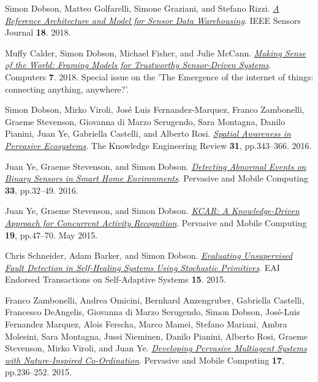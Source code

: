 \documentclass[11pt]{article}
\begin{document}
\label{orgd641fc9}Simon Dobson, Matteo Golfarelli, Simone Graziani, and Stefano Rizzi.  \emph{\href{https://dx.doi.org//10.1109/JSEN.2018.2861327}{A Reference Architecture and Model for Sensor Data Warehousing}}. IEEE Sensors Journal \textbf{18}. 2018.

\label{orge929091}Muffy Calder, Simon Dobson, Michael Fisher, and Julie McCann.  \emph{\href{https://dx.doi.org//10.3390/computers7040062}{Making Sense of the World: Framing Models for Trustworthy Sensor-Driven Systems}}. Computers \textbf{7}. 2018. Special issue on the ’The Emergence of the internet of things: connecting anything, anywhere?’.

\label{org598f9a7}Simon Dobson, Mirko Viroli, José Luis Fernandez-Marquez, Franco Zambonelli, Graeme Stevenson, Giovanna di Marzo Serugendo, Sara Montagna, Danilo Pianini, Juan Ye, Gabriella Castelli, and Alberto Rosi.  \emph{\href{https://dx.doi.org//10.1017/S0269888916000199}{Spatial Awareness in Pervasive Ecosystems}}. The Knowledge Engineering Review \textbf{31}, pp.343–366. 2016.

\label{org8dfdb3e}Juan Ye, Graeme Stevenson, and Simon Dobson.  \emph{\href{https://dx.doi.org//10.1016/j.pmcj.2016.06.012}{Detecting Abnormal Events on Binary Sensors in Smart Home Environments}}. Pervasive and Mobile Computing \textbf{33}, pp.32–49. 2016.

\label{org3b47051}Juan Ye, Graeme Stevenson, and Simon Dobson.  \emph{\href{https://dx.doi.org//10.1016/j.pmcj.2014.02.003}{KCAR: A Knowledge-Driven Approach for Concurrent Activity Recognition}}. Pervasive and Mobile Computing \textbf{19}, pp.47–70. May 2015.

\label{org433a925}Chris Schneider, Adam Barker, and Simon Dobson.  \emph{\href{https://dx.doi.org//10.4108/sas.1.1.e3}{Evaluating Unsupervised Fault Detection in Self-Healing Systems Using Stochastic Primitives}}. EAI Endorsed Transactions on Self-Adaptive Systems \textbf{15}. 2015.

\label{orgf87caf0}Franco Zambonelli, Andrea Omicini, Bernhard Anzengruber, Gabriella Castelli, Francesco DeAngelis, Giovanna di Marzo Serugendo, Simon Dobson, José-Luis Fernandez Marquez, Alois Ferscha, Marco Mamei, Stefano Mariani, Ambra Molesini, Sara Montagna, Jussi Nieminen, Danilo Pianini, Alberto Rosi, Graeme Stevenson, Mirko Viroli, and Juan Ye.  \emph{\href{https://dx.doi.org//10.1016/j.pmcj.2014.12.002}{Developing Pervasive Multiagent Systems with Nature-Inspired Co-Ordination}}. Pervasive and Mobile Computing \textbf{17}, pp.236–252. 2015.
\end{document}
